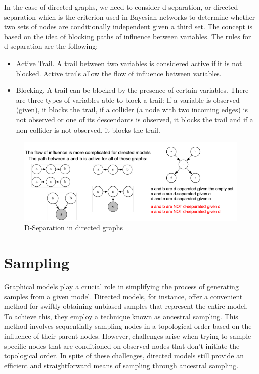 In the case of directed graphs, we need to consider d-separation, or directed separation which is the criterion used in Bayesian networks to determine whether two sets of nodes are conditionally independent given a third set. The concept is based on the idea of blocking paths of influence between variables. The rules for d-separation are the following:

\begin{itemize}
    \item Active Trail. A trail between two variables is considered active if it is not blocked. Active trails allow the flow of influence between variables. 
    \item Blocking. A trail can be blocked by the presence of certain variables. There are three types of variables able to block a trail: If a variable is observed (given), it blocks the trail, if a collider (a node with two incoming edges) is not observed or one of its descendants is observed, it blocks the trail and if a non-collider is not observed, it blocks the trail.

\end{itemize}

\begin{figure}[h]
    \centering
    \includegraphics[width=15cm]{Images/d-separation.png}
    \caption{D-Separation in directed graphs}
\end{figure}


\newpage
\section{Sampling}

Graphical models play a crucial role in simplifying the process of generating samples from a given model. Directed models, for instance, offer a convenient method for swiftly obtaining unbiased samples that represent the entire model. To achieve this, they employ a technique known as ancestral sampling. This method involves sequentially sampling nodes in a topological order based on the influence of their parent nodes. However, challenges arise when trying to sample specific nodes that are conditioned on observed nodes that don't initiate the topological order. In spite of these challenges, directed models still provide an efficient and straightforward means of sampling through ancestral sampling.

